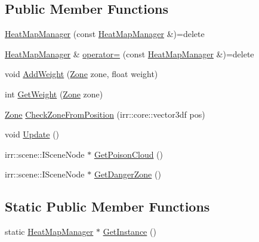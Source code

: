 \subsection*{Public Member Functions}
\begin{DoxyCompactItemize}
\item 
\hyperlink{class_heat_map_manager_a572c22efd1da42802d59bd5fad291d2f}{Heat\-Map\-Manager} (const \hyperlink{class_heat_map_manager}{Heat\-Map\-Manager} \&)=delete
\item 
\hyperlink{class_heat_map_manager}{Heat\-Map\-Manager} \& \hyperlink{class_heat_map_manager_a9444c0c491587928574da5f4c2079d8c}{operator=} (const \hyperlink{class_heat_map_manager}{Heat\-Map\-Manager} \&)=delete
\item 
void \hyperlink{class_heat_map_manager_aaf3b56067a76a49a9685b221d63c87b9}{Add\-Weight} (\hyperlink{class_heat_map_manager_a6d43bc39106e6d2e72437f8902a586b6}{Zone} zone, float weight)
\item 
int \hyperlink{class_heat_map_manager_a72fbb89ab0dd5fb8b9e760f199696b16}{Get\-Weight} (\hyperlink{class_heat_map_manager_a6d43bc39106e6d2e72437f8902a586b6}{Zone} zone)
\item 
\hyperlink{class_heat_map_manager_a6d43bc39106e6d2e72437f8902a586b6}{Zone} \hyperlink{class_heat_map_manager_a13bd9841f2166a91e2f3cf93671b82f9}{Check\-Zone\-From\-Position} (irr\-::core\-::vector3df pos)
\item 
void \hyperlink{class_heat_map_manager_ac11943d3f92891670ddf9e613d7c06dd}{Update} ()
\item 
irr\-::scene\-::\-I\-Scene\-Node $\ast$ \hyperlink{class_heat_map_manager_a326372f900540856c890eb311b04876b}{Get\-Poison\-Cloud} ()
\item 
irr\-::scene\-::\-I\-Scene\-Node $\ast$ \hyperlink{class_heat_map_manager_a45ef95be18d764cedf5095ace6d87204}{Get\-Danger\-Zone} ()
\end{DoxyCompactItemize}
\subsection*{Static Public Member Functions}
\begin{DoxyCompactItemize}
\item 
static \hyperlink{class_heat_map_manager}{Heat\-Map\-Manager} $\ast$ \hyperlink{class_heat_map_manager_acc2cf6cbce0774a997ef1c408f07fb87}{Get\-Instance} ()
\end{DoxyCompactItemize}
